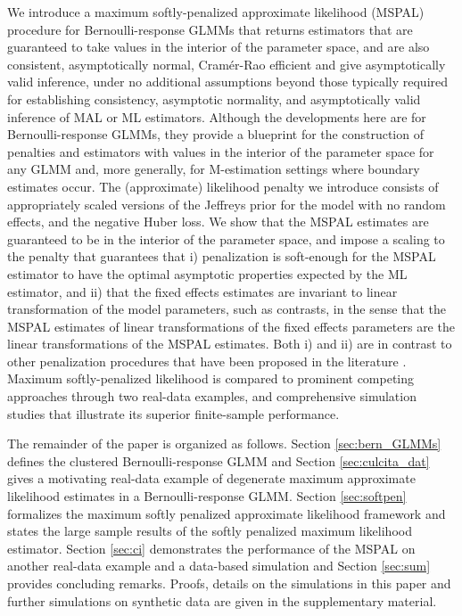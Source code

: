 \documentclass[11pt, a4paper]{article}
\theoremstyle{example} \newtheorem{example}{Example}[section]
\theoremstyle{theorem} \newtheorem{theorem}{Theorem}[section]
\begin{document}
We introduce a maximum softly-penalized approximate likelihood (MSPAL)
procedure for Bernoulli-response GLMMs that returns estimators that
are guaranteed to take values in the interior of the parameter space,
and are also consistent, asymptotically normal, Cram\'{e}r-Rao
efficient and give asymptotically valid inference, under no additional assumptions beyond those typically
required for establishing consistency, asymptotic normality, and asymptotically valid inference of MAL
or ML estimators. Although the developments here are for
Bernoulli-response GLMMs, they provide a blueprint for the
construction of penalties and estimators with values in the interior
of the parameter space for any GLMM and, more generally, for
M-estimation settings where boundary estimates occur. The
(approximate) likelihood penalty we introduce consists of
appropriately scaled versions of the Jeffreys prior for the model with
no random effects, and the negative Huber loss. We show that the MSPAL
estimates are guaranteed to be in the interior of the parameter space,
and impose a scaling to the penalty
that guarantees that i) penalization is soft-enough for the MSPAL
estimator to have the optimal asymptotic properties expected by the ML
estimator, and ii) that the fixed effects estimates are invariant to linear
transformation of the model parameters, such as contrasts, in the
sense that the MSPAL estimates of linear transformations of the fixed
effects parameters are the linear transformations of the MSPAL
estimates. Both i) and ii) are in contrast to other penalization
procedures that have been proposed in the literature \citep[see, for
example,][]{chung+etal:2013, chung+etal:2015}. Maximum
softly-penalized likelihood is compared to prominent competing
approaches through two real-data examples, and comprehensive
simulation studies that illustrate its superior finite-sample
performance. 

The remainder of the paper is organized as follows. Section \ref{sec:bern_GLMMs} defines the clustered
Bernoulli-response GLMM and Section \ref{sec:culcita_dat} gives a motivating real-data example of
degenerate maximum approximate likelihood estimates in a Bernoulli-response GLMM. Section
\ref{sec:softpen} formalizes the maximum softly penalized approximate likelihood framework and
states the large sample results of the softly penalized maximum
likelihood estimator. Section \ref{sec:ci} demonstrates the performance of the MSPAL on another real-data example and a data-based simulation and Section \ref{sec:sum} provides concluding remarks. Proofs, details on the simulations in this paper and further simulations on synthetic data are given in the supplementary material. 
\end{document}
